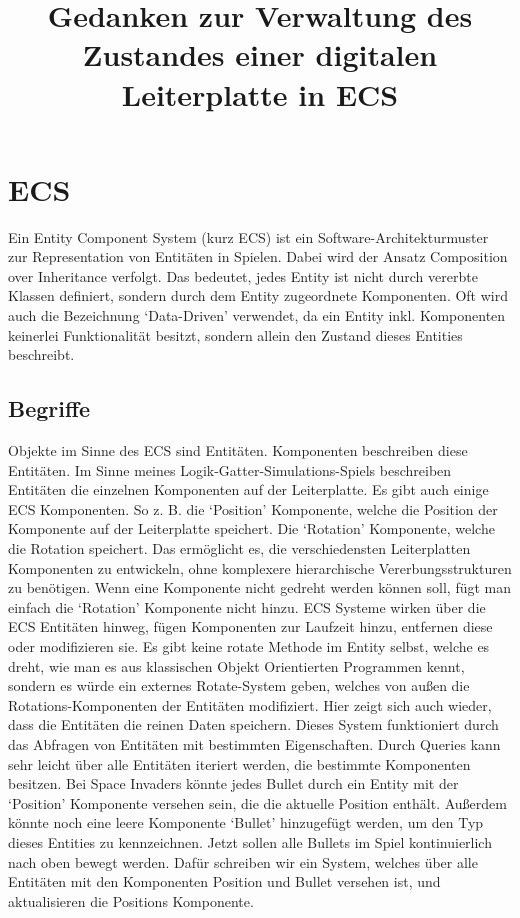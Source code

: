 \documentclass{article}
\title{Gedanken zur Verwaltung des Zustandes einer digitalen Leiterplatte in ECS}
\begin{document}
    \section{ECS}
    Ein Entity Component System (kurz ECS) ist ein Software-Architekturmuster zur
    Representation von Entitäten in Spielen.
    Dabei wird der Ansatz Composition over Inheritance verfolgt.
    Das bedeutet, jedes Entity ist nicht durch vererbte Klassen definiert,
    sondern durch dem Entity zugeordnete Komponenten.
    Oft wird auch die Bezeichnung `Data-Driven' verwendet, da ein Entity inkl. Komponenten
    keinerlei Funktionalität besitzt, sondern allein den Zustand dieses Entities beschreibt.

    \subsection{Begriffe}
    Objekte im Sinne des ECS sind Entitäten.
    Komponenten beschreiben diese Entitäten.
    Im Sinne meines Logik-Gatter-Simulations-Spiels beschreiben Entitäten die einzelnen Komponenten
    auf der Leiterplatte.
    Es gibt auch einige ECS Komponenten.
    So z. B. die `Position' Komponente, welche die Position der Komponente auf der Leiterplatte speichert.
    Die `Rotation' Komponente, welche die Rotation speichert.
    Das ermöglicht es, die verschiedensten Leiterplatten Komponenten zu entwickeln, ohne komplexere hierarchische
    Vererbungsstrukturen zu benötigen.
    Wenn eine Komponente nicht gedreht werden können soll, fügt man einfach die `Rotation' Komponente nicht hinzu.
    ECS Systeme wirken über die ECS Entitäten hinweg, fügen Komponenten zur Laufzeit hinzu, entfernen diese oder modifizieren sie.
    Es gibt keine rotate Methode im Entity selbst, welche es dreht, wie man es aus klassischen Objekt Orientierten Programmen
    kennt, sondern es würde ein externes Rotate-System geben, welches von außen die Rotations-Komponenten der Entitäten modifiziert.
    Hier zeigt sich auch wieder, dass die Entitäten die reinen Daten speichern.
    Dieses System funktioniert durch das Abfragen von Entitäten mit bestimmten Eigenschaften.
    Durch Queries kann sehr leicht über
    alle Entitäten iteriert werden, die bestimmte Komponenten besitzen.
    Bei Space Invaders könnte jedes Bullet durch ein Entity mit der `Position' Komponente versehen sein, die die aktuelle Position enthält.
    Außerdem könnte noch eine leere Komponente `Bullet' hinzugefügt werden, um den Typ dieses Entities zu kennzeichnen.
    Jetzt sollen alle Bullets im Spiel kontinuierlich nach oben bewegt werden. Dafür schreiben wir ein System, welches über alle Entitäten
    mit den Komponenten Position und Bullet versehen ist, und aktualisieren die Positions Komponente.
\end{document}
